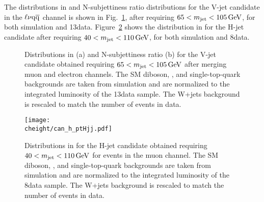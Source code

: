 The distributions in \pt and N-subjettiness ratio \nsubj distributions for the V-jet candidate in the $\ell\nu\mathrm{q}\overline{\mathrm{q}}$ channel is shown in Fig.~\ref{fig:controlPlots13TeV},
after requiring $65 < m_{\text{jet}} < 105\,\text{Ge\hspace{-.08em}V}$, for both simulation and 13\TeV data.  Figure~\ref{fig:controlPlots8TeV} shows the distribution in \pt for the H-jet candidate
after requiring $40 < m_{\text{jet}} < 110\,\text{Ge\hspace{-.08em}V}$, for both simulation and 8\TeV data.

\begin{figure}[!htb]
\centering
{}
\caption{Distributions in \pt (a) and N-subjettiness ratio \nsubj (b) for the V-jet candidate obtained requiring $65 < m_{\text{jet}} < 105\,\text{Ge\hspace{-.08em}V}$ after merging muon and electron channels. The SM diboson, \ttbar, and single-top-quark backgrounds are taken from simulation and are normalized to the integrated luminosity of the 13\TeV data sample. The W+jets background is rescaled to match the number of events in data.}
\label{fig:controlPlots13TeV}
\end{figure}

\begin{figure}[!htb]
\centering
\texttt{[image: \\cheight/can\_h\_ptHjj.pdf]}
\caption{Distributions in \pt for the H-jet candidate obtained requiring $40 < m_{\text{jet}} < 110\,\text{Ge\hspace{-.08em}V}$ for events in the muon channel. The SM diboson, \ttbar, and single-top-quark backgrounds are taken from simulation and are normalized to the integrated luminosity of the 8\TeV data sample. The W+jets background is rescaled to match the number of events in data.}
\label{fig:controlPlots8TeV}
\end{figure}